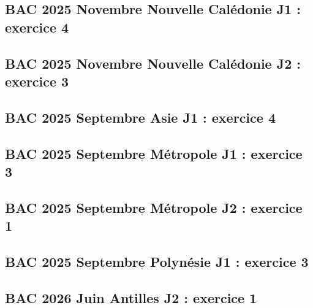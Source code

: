 \documentclass[lang=fr,edition=teacher,layout=sheet]{mxbook}
\begin{document}
\subsection*{BAC 2025 Novembre Nouvelle Calédonie J1 : exercice 4}
\begingroup\endgroup
\par\bigskip
{}\subsection*{BAC 2025 Novembre Nouvelle Calédonie J2 : exercice 3}
\begingroup\endgroup
\par\bigskip
{}\subsection*{BAC 2025 Septembre Asie J1 : exercice 4}
\begingroup\endgroup
\par\bigskip
{}\subsection*{BAC 2025 Septembre Métropole J1 : exercice 3}
\begingroup\endgroup
\par\bigskip
{}\subsection*{BAC 2025 Septembre Métropole J2 : exercice 1}
\begingroup\endgroup
\par\bigskip
{}\subsection*{BAC 2025 Septembre Polynésie J1 : exercice 3}
\begingroup\endgroup
\par\bigskip
{}\subsection*{BAC 2026 Juin Antilles J2 : exercice 1}
\end{document}
